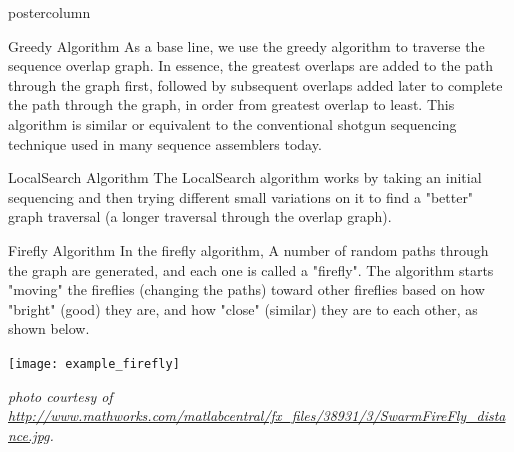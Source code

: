 \documentclass[final,hyperref={pdfpagelabels=false}]{beamer}
\begin{document}
\begin{frame}
\begin{columns}
\begin{column}{.32\textwidth}
\begin{beamercolorbox}[center,wd=\textwidth]{postercolumn}
\begin{minipage}[T]{.95\textwidth}
{\begin{block}{Greedy Algorithm}
                            As a base line, we use the greedy algorithm to
                            traverse the sequence overlap graph.  In essence,
                            the greatest overlaps are added to the path through
                            the graph first, followed by subsequent overlaps
                            added later to complete the path through the graph,
                            in order from greatest overlap to least.  This
                            algorithm is similar or equivalent to the
                            conventional shotgun sequencing technique used in
                            many sequence assemblers today.
                        \end{block}
                        \begin{block}{LocalSearch Algorithm}
                            The LocalSearch algorithm works by taking an
                            initial sequencing and then trying different small
                            variations on it to find a "better" graph traversal
                            (a longer traversal through the overlap graph).
                        \end{block}
                        \begin{block}{Firefly Algorithm}
                            In the firefly algorithm, A number of
                            random paths through the graph are generated, and
                            each one is called a "firefly". The algorithm
                            starts "moving" the fireflies (changing the paths)
                            toward other fireflies based on how "bright" (good)
                            they are, and how "close" (similar) they are to
                            each other, as shown below.
                            \begin{center}
                                \texttt{[image: example\_firefly]}
                            \end{center}
                            {\em {\small photo courtesy of \url{http://www.mathworks.com/matlabcentral/fx_files/38931/3/SwarmFireFly_distance.jpg}. } }
                             

\end{block}}
\end{minipage}
\end{beamercolorbox}
\end{column}
\end{columns}
\end{frame}
\end{document}
